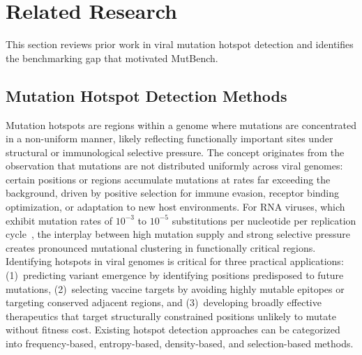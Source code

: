 
\section{Related Research}
\label{ch:background}\label{sec:bg_hotspot}

This section reviews prior work in viral mutation hotspot detection and identifies the benchmarking gap that motivated MutBench.

\subsection{Mutation Hotspot Detection Methods}
\label{subsec:bg_hotspot_methods}

Mutation hotspots are regions within a genome where mutations are concentrated in a non-uniform manner, likely reflecting functionally important sites under structural or immunological selective pressure.
The concept originates from the observation that mutations are not distributed uniformly across viral genomes: certain positions or regions accumulate mutations at rates far exceeding the background, driven by positive selection for immune evasion, receptor binding optimization, or adaptation to new host environments.
For RNA viruses, which exhibit mutation rates of $10^{-3}$ to $10^{-5}$ substitutions per nucleotide per replication cycle~\cite{holmes2009evolution,sanjuan2010viral}, the interplay between high mutation supply and strong selective pressure creates pronounced mutational clustering in functionally critical regions.
Identifying hotspots in viral genomes is critical for three practical applications: (1)~predicting variant emergence by identifying positions predisposed to future mutations, (2)~selecting vaccine targets by avoiding highly mutable epitopes or targeting conserved adjacent regions, and (3)~developing broadly effective therapeutics that target structurally constrained positions unlikely to mutate without fitness cost.
Existing hotspot detection approaches can be categorized into frequency-based, entropy-based, density-based, and selection-based methods.

